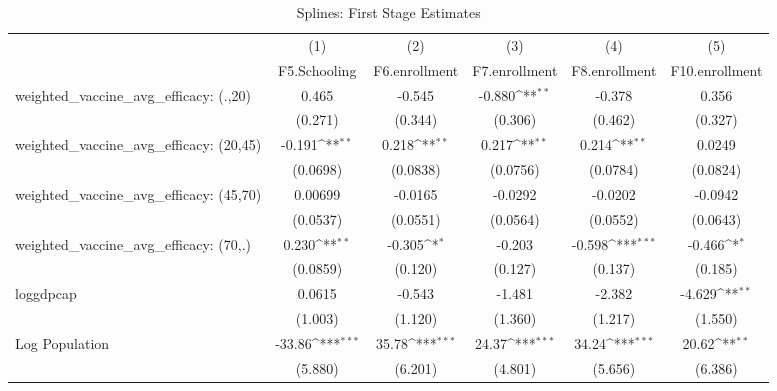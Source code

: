 \begin{table}[htbp]\centering
\def\sym#1{\ifmmode^{#1}\else\(^{#1}\)\fi}
\caption{Splines: First Stage Estimates}
\begin{tabular}{l*{5}{c}}
\toprule
                &\multicolumn{1}{c}{(1)}&\multicolumn{1}{c}{(2)}&\multicolumn{1}{c}{(3)}&\multicolumn{1}{c}{(4)}&\multicolumn{1}{c}{(5)}\\
                &\multicolumn{1}{c}{F5.Schooling}&\multicolumn{1}{c}{F6.enrollment}&\multicolumn{1}{c}{F7.enrollment}&\multicolumn{1}{c}{F8.enrollment}&\multicolumn{1}{c}{F10.enrollment}\\
\midrule
weighted\_vaccine\_avg\_efficacy: (.,20)&    0.465         &   -0.545         &   -0.880\sym{**} &   -0.378         &    0.356         \\
                &  (0.271)         &  (0.344)         &  (0.306)         &  (0.462)         &  (0.327)         \\
\addlinespace
weighted\_vaccine\_avg\_efficacy: (20,45)&   -0.191\sym{**} &    0.218\sym{**} &    0.217\sym{**} &    0.214\sym{**} &   0.0249         \\
                & (0.0698)         & (0.0838)         & (0.0756)         & (0.0784)         & (0.0824)         \\
\addlinespace
weighted\_vaccine\_avg\_efficacy: (45,70)&  0.00699         &  -0.0165         &  -0.0292         &  -0.0202         &  -0.0942         \\
                & (0.0537)         & (0.0551)         & (0.0564)         & (0.0552)         & (0.0643)         \\
\addlinespace
weighted\_vaccine\_avg\_efficacy: (70,.)&    0.230\sym{**} &   -0.305\sym{*}  &   -0.203         &   -0.598\sym{***}&   -0.466\sym{*}  \\
                & (0.0859)         &  (0.120)         &  (0.127)         &  (0.137)         &  (0.185)         \\
\addlinespace
loggdpcap       &   0.0615         &   -0.543         &   -1.481         &   -2.382         &   -4.629\sym{**} \\
                &  (1.003)         &  (1.120)         &  (1.360)         &  (1.217)         &  (1.550)         \\
\addlinespace
Log Population  &   -33.86\sym{***}&    35.78\sym{***}&    24.37\sym{***}&    34.24\sym{***}&    20.62\sym{**} \\
                &  (5.880)         &  (6.201)         &  (4.801)         &  (5.656)         &  (6.386)         \\

\end{tabular}
\end{table}

